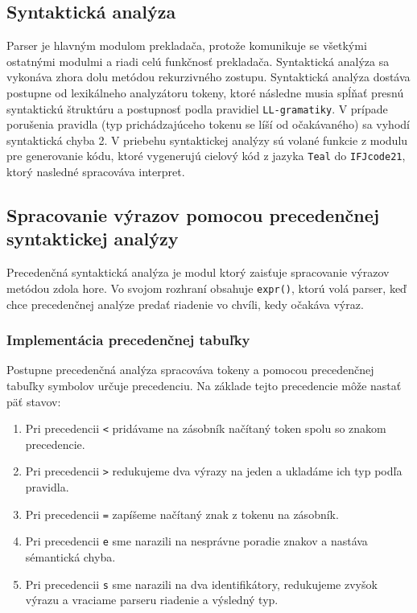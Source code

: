 \documentclass[a4paper, 11pt]{article}
\begin{document}
    \subsection{Syntaktická analýza}
    Parser je hlavným modulom prekladača, protože komunikuje se všetkými ostatnými modulmi a riadi celú funkčnosť
    prekladača. Syntaktická analýza sa vykonáva zhora dolu metódou rekurzivného zostupu.
    Syntaktická analýza dostáva postupne od lexikálneho analyzátoru tokeny, ktoré následne musia spĺňať presnú
    syntaktickú štruktúru a postupnosť podla pravidiel \texttt{LL-gramatiky}.
    V prípade porušenia pravidla (typ prichádzajúceho tokenu se líší od očakávaného) sa vyhodí syntaktická chyba 2.
    V priebehu syntaktickej analýzy sú volané funkcie z modulu pre generovanie kódu, ktoré vygenerujú cielový kód z
    jazyka \texttt{Teal} do \texttt{IFJcode21}, ktorý nasledné spracováva interpret.



    \subsection{Spracovanie výrazov pomocou precedenčnej syntaktickej analýzy}
    Precedenčná syntaktická analýza je modul ktorý zaisťuje spracovanie výrazov metódou zdola hore.
    Vo svojom rozhraní obsahuje \texttt{expr()}, ktorú volá parser, keď chce precedenčnej analýze predať
    riadenie vo chvíli, kedy očakáva výraz.
    \subsubsection{Implementácia precedenčnej tabuľky}
    Postupne precedenčná analýza spracováva tokeny a pomocou precedenčnej tabuľky symbolov
    určuje precedenciu. Na základe tejto precedencie môže nastať päť stavov:
    \begin{enumerate}
        \item Pri precedencii \texttt{<} pridávame na zásobník načítaný token spolu so znakom precedencie.
        \item Pri precedencii \texttt{>} redukujeme dva výrazy na jeden a ukladáme ich typ podľa pravidla.
        \item Pri precedencii \texttt{=} zapíšeme načítaný znak z tokenu na zásobník.
        \item Pri precedencii \texttt{e} sme narazili na nesprávne poradie znakov a nastáva sémantická chyba.
        \item Pri precedencii \texttt{s} sme narazili na dva identifikátory, redukujeme zvyšok výrazu a vraciame parseru riadenie a výsledný typ.
    \end{enumerate}
\end{document}
